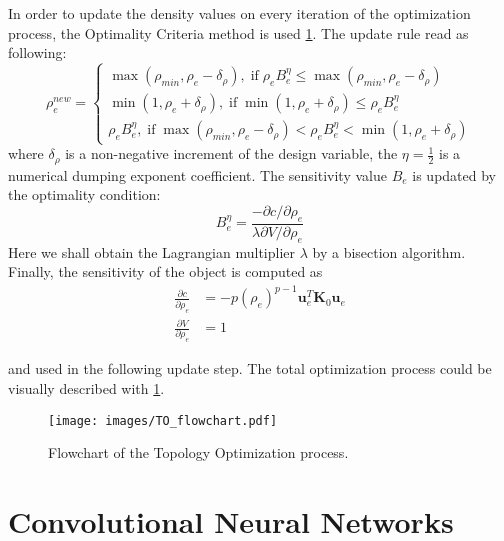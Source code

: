 In order to update the density values on every iteration of the optimization process, the Optimality Criteria method is used \ref{}.
The update rule read as following:
\[ \rho^{new}_{e} = 
\begin{cases}
	\max(\rho_{min},\rho_{e}-\delta_{\rho}) , \; \mathrm{if} \; \rho_{e}B^{\eta}_{e} \leq \max(\rho_{min},\rho_{e}-\delta_{\rho}) \\
	\min(1,\rho_{e}+\delta_{\rho}), \; \mathrm{if} \; \min(1,\rho_{e}+\delta_{\rho}) \leq \rho_{e}B^{\eta}_{e}\\
	\rho_{e}B^{\eta}_{e}, \; \mathrm{if} \; \max(\rho_{min},\rho_{e}-\delta_{\rho}) < \rho_{e}B^{\eta}_{e} < \min(1,\rho_{e}+\delta_{\rho}) 
\end{cases}
\]
where $\delta_{\rho}$ is a non-negative increment of the design variable, the $\eta = \frac{1}{2} $ is a numerical dumping exponent coefficient.
The sensitivity value $B_{e}$ is updated by the optimality condition:
\begin{equation}
	B^{\eta}_{e} = \frac{-\partial c / \partial \rho_{e}}{\lambda \partial V / \partial \rho_{e}}
\end{equation}
Here we shall obtain the Lagrangian multiplier $\lambda$ by a bisection algorithm.
Finally, the sensitivity of the object is computed as 
\begin{align*}
	\frac{\partial c}{\partial \rho_{e}} & = -p(\rho_{e})^{p-1} \mathbf{u}^{T}_{e} \mathbf{K}_{0} \mathbf{u}_{e}\\
	\frac{\partial V}{\partial \rho_{e}} & = 1
\end{align*}

and used in the following update step.
The total optimization process could be visually described with \ref{fig:to_flow}.

\begin{figure}[]
	\centering
	\texttt{[image: images/TO\_flowchart.pdf]}
	\caption{Flowchart of the Topology Optimization process.}
	\label{fig:to_flow}
\end{figure}




\section{Convolutional Neural Networks}


